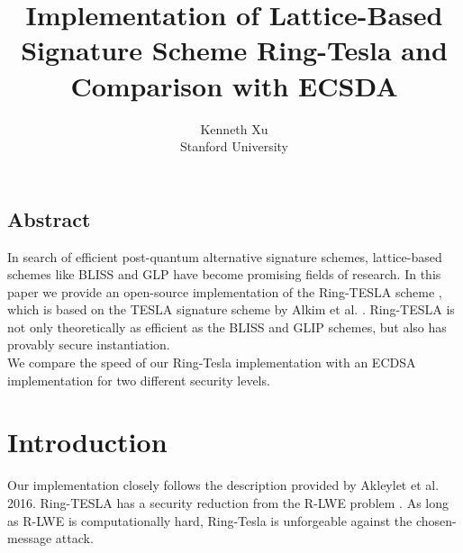 \documentclass[letterpaper,twocolumn,10pt]{article}
\begin{document}
\date{}

\title{\Large \bf Implementation of Lattice-Based Signature Scheme Ring-Tesla and Comparison with ECSDA}

\author{
{\rm Kenneth Xu }\\
  Stanford University
}

\maketitle

\thispagestyle{empty}


\subsection*{Abstract}
In search of efficient post-quantum alternative signature schemes, lattice-based schemes like BLISS and GLP have become promising fields of research. In this paper we provide an open-source implementation of the Ring-TESLA scheme \cite{rTesla}, which is based on the TESLA signature scheme by Alkim et al. \cite{Tesla}. Ring-TESLA is not only theoretically as efficient as the BLISS and GLIP schemes, but also has provably secure instantiation.\\
We compare the speed of our Ring-Tesla implementation with an ECDSA implementation for two different security levels.

\section{Introduction}
Our implementation closely follows the description provided by Akleylet et al. 2016. Ring-TESLA has a security reduction from the R-LWE problem \cite{reduction} . As long as R-LWE is computationally hard, Ring-Tesla is unforgeable against the chosen-message attack. \cite{rTesla}
\end{document}
